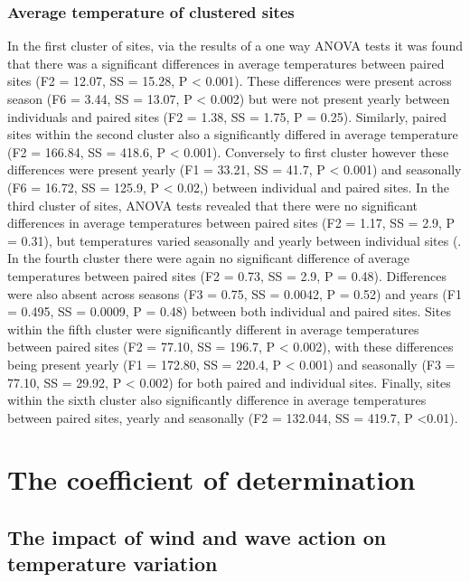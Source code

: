 \documentclass[12pt,]{article}
\begin{document}
\subsubsection{Average temperature of clustered
sites}\label{average-temperature-of-clustered-sites}

In the first cluster of sites, via the results of a one way ANOVA tests
it was found that there was a significant differences in average
temperatures between paired sites (F2 = 12.07, SS = 15.28, P \textless{}
0.001). These differences were present across season (F6 = 3.44, SS =
13.07, P \textless{} 0.002) but were not present yearly between
individuals and paired sites (F2 = 1.38, SS = 1.75, P = 0.25).
Similarly, paired sites within the second cluster also a significantly
differed in average temperature (F2 = 166.84, SS = 418.6, P \textless{}
0.001). Conversely to first cluster however these differences were
present yearly (F1 = 33.21, SS = 41.7, P \textless{} 0.001) and
seasonally (F6 = 16.72, SS = 125.9, P \textless{} 0.02,) between
individual and paired sites. In the third cluster of sites, ANOVA tests
revealed that there were no significant differences in average
temperatures between paired sites (F2 = 1.17, SS = 2.9, P = 0.31), but
temperatures varied seasonally and yearly between individual sites (. In
the fourth cluster there were again no significant difference of average
temperatures between paired sites (F2 = 0.73, SS = 2.9, P = 0.48).
Differences were also absent across seasons (F3 = 0.75, SS = 0.0042, P =
0.52) and years (F1 = 0.495, SS = 0.0009, P = 0.48) between both
individual and paired sites. Sites within the fifth cluster were
significantly different in average temperatures between paired sites (F2
= 77.10, SS = 196.7, P \textless{} 0.002), with these differences being
present yearly (F1 = 172.80, SS = 220.4, P \textless{} 0.001) and
seasonally (F3 = 77.10, SS = 29.92, P \textless{} 0.002) for both paired
and individual sites. Finally, sites within the sixth cluster also
significantly difference in average temperatures between paired sites,
yearly and seasonally (F2 = 132.044, SS = 419.7, P \textless{}0.01).

\section{The coefficient of
determination}\label{the-coefficient-of-determination}

\subsection{The impact of wind and wave action on temperature
variation}\label{the-impact-of-wind-and-wave-action-on-temperature-variation}
\end{document}
